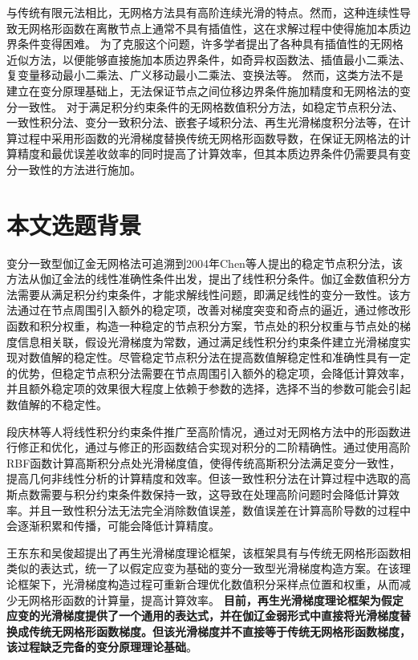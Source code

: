 与传统有限元法相比，无网格方法具有高阶连续光滑的特点。然而，这种连续性导致无网格形函数在离散节点上通常不具有插值性，这在求解过程中使得施加本质边界条件变得困难。
为了克服这个问题，许多学者提出了各种具有插值性的无网格近似方法，以便能够直接施加本质边界条件\cite{CaoYang2020,fernandez-mendez2004}，如奇异权函数法\cite{kaljevic1997}、插值最小二乘法\cite{liu2019,ChenXinXin2021}、复变量移动最小二乘法\cite{ChengYuMin2005}、广义移动最小二乘法\cite{HuangJuan2007}、变换法\cite{chen2000}等。
然而，这类方法不是建立在变分原理基础上，无法保证节点之间位移边界条件施加精度和无网格法的变分一致性。
对于满足积分约束条件的无网格数值积分方法，如稳定节点积分法\cite{chen2001}、一致性积分法\cite{陈嵩涛2020几何非线性分析的高效高阶无网格法,duan2012}、变分一致积分法\cite{chen2013}、嵌套子域积分法\cite{wang2016}、再生光滑梯度积分法\cite{wang2019}等，在计算过程中采用形函数的光滑梯度替换传统无网格形函数导数，在保证无网格法的计算精度和最优误差收敛率的同时提高了计算效率，但其本质边界条件仍需要具有变分一致性的方法进行施加\cite{WuJunChao2016,hillman2021}。

\section{本文选题背景}
变分一致型伽辽金无网格法可追溯到2004年Chen等人\cite{chen2001}提出的稳定节点积分法，该方法从伽辽金法的线性准确性条件出发，提出了线性积分条件。伽辽金数值积分方法需要从满足积分约束条件，才能求解线性问题，即满足线性的变分一致性。该方法通过在节点周围引入额外的稳定项，改善对梯度突变和奇点的逼近，通过修改形函数和积分权重，构造一种稳定的节点积分方案，节点处的积分权重与节点处的梯度信息相关联，假设光滑梯度为常数，通过满足线性积分约束条件建立光滑梯度实现对数值解的稳定性。尽管稳定节点积分法在提高数值解稳定性和准确性具有一定的优势，但稳定节点积分法需要在节点周围引入额外的稳定项，会降低计算效率，并且额外稳定项的效果很大程度上依赖于参数的选择，选择不当的参数可能会引起数值解的不稳定性。

段庆林等人\cite{陈嵩涛2020几何非线性分析的高效高阶无网格法,duan2012}将线性积分约束条件推广至高阶情况，通过对无网格方法中的形函数进行修正和优化，通过与修正的形函数结合实现对积分的二阶精确性。通过使用高阶RBF函数计算高斯积分点处光滑梯度值，使得传统高斯积分法满足变分一致性，提高几何非线性分析的计算精度和效率。但该一致性积分法在计算过程中选取的高斯点数需要与积分约束条件数保持一致，这导致在处理高阶问题时会降低计算效率。并且一致性积分法无法完全消除数值误差，数值误差在计算高阶导数的过程中会逐渐积累和传播，可能会降低计算精度。

王东东和吴俊超提出了再生光滑梯度理论框架\cite{wang2019}，该框架具有与传统无网格形函数相类似的表达式，统一了以假定应变为基础的变分一致型光滑梯度构造方案。在该理论框架下，光滑梯度构造过程可重新合理优化数值积分采样点位置和权重，从而减少无网格形函数的计算量，提高计算效率。
\textbf{目前，再生光滑梯度理论框架为假定应变的光滑梯度提供了一个通用的表达式，并在伽辽金弱形式中直接将光滑梯度替换成传统无网格形函数梯度。但该光滑梯度并不直接等于传统无网格形函数梯度，该过程缺乏完备的变分原理理论基础}。

